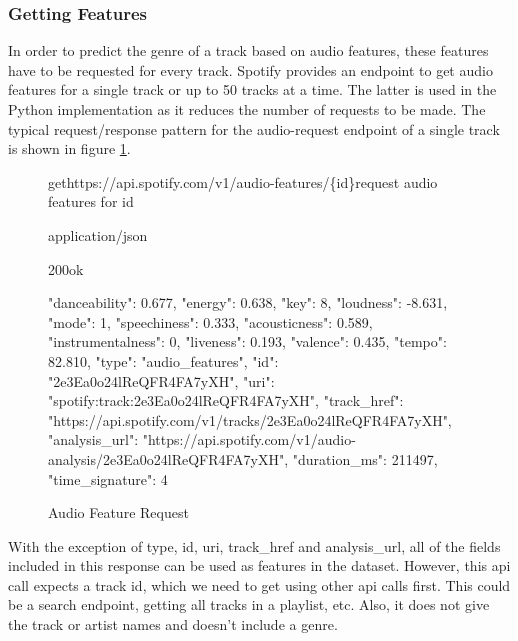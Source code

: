 \subsubsection{Getting Features}

In order to predict the genre of a track based on audio features, these features have to be requested
for every track. Spotify provides an endpoint to get audio features for a single track or up to 50 tracks at
a time. The latter is used in the Python implementation as it reduces the number of requests to be made.
The typical request/response pattern for the audio-request endpoint of a single track is shown in
figure \ref{fig:Audio Feature Request}.

\begin{figure}[H]
    \caption{Audio Feature Request}
	\label{fig:Audio Feature Request}
\begin{apiRoute}{get}{https://api.spotify.com/v1/audio-features/\{id\}}{request audio features for id}
    \methodJson
    \begin{routeParameter}
    \end{routeParameter}
    \begin{routeResponse}{application/json}
        \begin{routeResponseItem}{200}{ok}
            \begin{routeResponseItemBody}
{
    "danceability": 0.677,
    "energy": 0.638,
    "key": 8,
    "loudness": -8.631,
    "mode": 1,
    "speechiness": 0.333,
    "acousticness": 0.589,
    "instrumentalness": 0,
    "liveness": 0.193,
    "valence": 0.435,
    "tempo": 82.810,
    "type": "audio_features",
    "id": "2e3Ea0o24lReQFR4FA7yXH",
    "uri": "spotify:track:2e3Ea0o24lReQFR4FA7yXH",
    "track_href": "https://api.spotify.com/v1/tracks/2e3Ea0o24lReQFR4FA7yXH",
    "analysis_url": "https://api.spotify.com/v1/audio-analysis/2e3Ea0o24lReQFR4FA7yXH",
    "duration_ms": 211497,
    "time_signature": 4
}
            \end{routeResponseItemBody}
        \end{routeResponseItem}
    \end{routeResponse}
\end{apiRoute}
\end{figure}

With the exception of type, id, uri, track\_href and analysis\_url, all of the fields included in this response
can be used as features in the dataset. However, this api call expects a track id, which we need to get using
other api calls first. This could be a search endpoint, getting all tracks in a playlist, etc.
Also, it does not give the track or artist names and doesn't include a genre.

